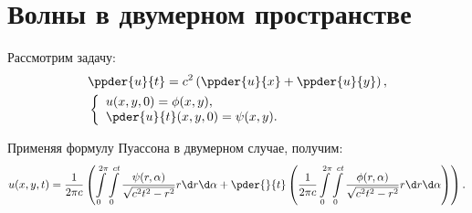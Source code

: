 \section{Волны в двумерном пространстве}

Рассмотрим задачу:
\begin{align*}
    & \ppder{u}{t} = c^2\left(\ppder{u}{x} + \ppder{u}{y}\right), \\
    & \left\{ \begin{array}{l}
        u(x, y, 0) = \phi(x, y), \\
        \ds \pder{u}{t}(x, y, 0) = \psi(x, y).
    \end{array} \right.
\end{align*}

Применяя формулу Пуассона в двумерном случае, получим:
\[
    u(x, y, t) = \frac{1}{2\pi c}\left(\int\limits_0^{2\pi}\int\limits_0^{ct}
    \frac{\psi(r, \alpha)}{\sqrt{c^2t^2 - r^2}}r\d r\d\alpha + \pder{}{t}\left(
    \frac{1}{2\pi c}\int\limits_0^{2\pi}\int\limits_0^{ct}\frac{\phi(r, \alpha)}
    {\sqrt{c^2t^2 - r^2}}r\d r\d\alpha\right)\right).
\]
\newpage
